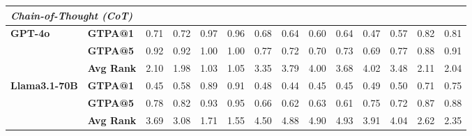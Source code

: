 \begin{table*}[h]
\begin{tabular}{l l cccc cccc cccc}
    \midrule
    \midrule
    \multicolumn{14}{l}{\textit{\textbf{Chain-of-Thought (CoT)}}}\\
    \midrule
    \multirow{3}{*}{\textbf{GPT-4o}} 
    & \textbf{GTPA@1} & 0.71 & 0.72 & 0.97 & 0.96 & 0.68 & 0.64 & 0.60 & 0.64 & 0.47 & 0.57 & 0.82 & 0.81 \\
    & \textbf{GTPA@5} & 0.92 & 0.92 & 1.00 & 1.00 & 0.77 & 0.72 & 0.70 & 0.73 & 0.69 & 0.77 & 0.88 & 0.91 \\
    & \textbf{Avg Rank} & 2.10 & 1.98 & 1.03 & 1.05 & 3.35 & 3.79 & 4.00 & 3.68 & 4.02 & 3.48 & 2.11 & 2.04 \\
    \midrule

    \multirow{3}{*}{\textbf{Llama3.1-70B}} 
    & \textbf{GTPA@1} & 0.45 & 0.58 & 0.89 & 0.91 & 0.48 & 0.44 & 0.45 & 0.45 & 0.49 & 0.50 & 0.71 & 0.75 \\
    & \textbf{GTPA@5} & 0.78 & 0.82 & 0.93 & 0.95 & 0.66 & 0.62 & 0.63 & 0.61 & 0.75 & 0.72 & 0.87 & 0.88 \\
    & \textbf{Avg Rank} & 3.69 & 3.08 & 1.71 & 1.55 & 4.50 & 4.88 & 4.90 & 4.93 & 3.91 & 4.04 & 2.62 & 2.35 \\


\end{tabular}
\end{table*}
